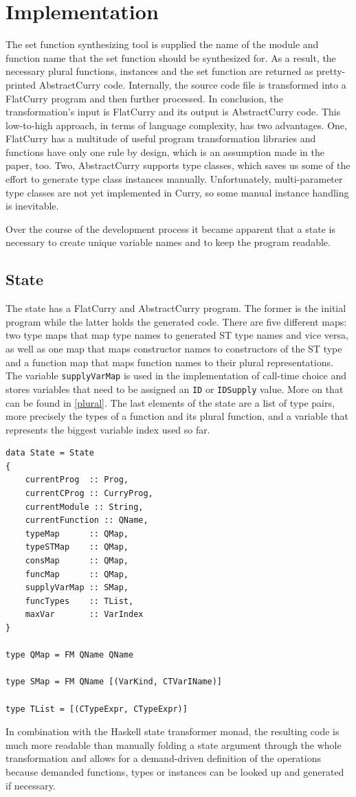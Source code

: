 \documentclass[a4paper, 11pt, fleqn]{scrreprt}
\newcommand{\cinline}[1]{\texttt{#1}}
\begin{document}
\chapter{Implementation}
The set function synthesizing tool is supplied the name of the module and function name that the set function should be synthesized for. As a result, the necessary plural functions, instances and the set function are returned as pretty-printed AbstractCurry code. Internally, the source code file is transformed into a FlatCurry program and then further processed. In conclusion, the transformation's input is FlatCurry and its output is AbstractCurry code. This low-to-high approach, in terms of language complexity, has two advantages. One, FlatCurry has a multitude of useful program transformation libraries and functions have only one rule by design, which is an assumption made in the paper, too. Two, AbstractCurry supports type classes, which saves us some of the effort to generate type class instances manually. Unfortunately, multi-parameter type classes are not yet implemented in Curry, so some manual instance handling is inevitable.

Over the course of the development process it became apparent that a state is necessary to create unique variable names and to keep the program readable.

\section{State}
The state has a FlatCurry and AbstractCurry program. The former is the initial program while the latter holds the generated code. There are five different maps: two type maps that map type names to generated ST type names and vice versa, as well as one map that maps constructor names to constructors of the ST type and a function map that maps function names to their plural representations. The variable \cinline{supplyVarMap} is used in the implementation of call-time choice and stores variables that need to be assigned an \cinline{ID} or \cinline{IDSupply} value. More on that can be found in \autoref{plural}. The last elements of the state are a list of type pairs, more precisely the types of a function and its plural function, and a variable that represents the biggest variable index used so far.
\begin{verbatim}
data State = State
{
    currentProg  :: Prog,
    currentCProg :: CurryProg,
    currentModule :: String,
    currentFunction :: QName,
    typeMap      :: QMap,
    typeSTMap    :: QMap,
    consMap      :: QMap,
    funcMap      :: QMap,
    supplyVarMap :: SMap,
    funcTypes    :: TList,
    maxVar       :: VarIndex
}

type QMap = FM QName QName

type SMap = FM QName [(VarKind, CTVarIName)]

type TList = [(CTypeExpr, CTypeExpr)]
\end{verbatim}
In combination with the Haskell state transformer monad, the resulting code is much more readable than manually folding a state argument through the whole transformation and allows for a demand-driven definition of the operations because demanded functions, types or instances can be looked up and generated if necessary.
\end{document}
